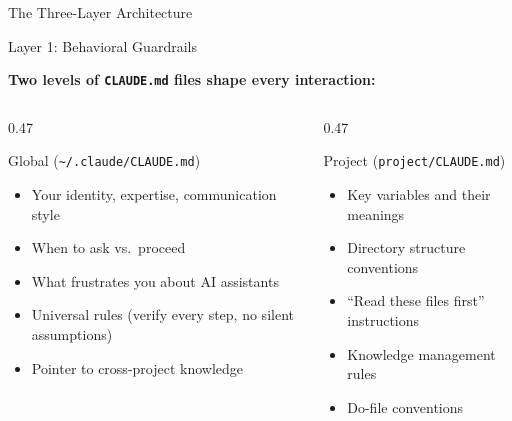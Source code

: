 \documentclass[aspectratio=169,11pt]{beamer}
\begin{document}
\begin{frame}{The Three-Layer Architecture}

\end{frame}

\begin{frame}[shrink=8]{Layer 1: Behavioral Guardrails}

\textbf{Two levels of \texttt{CLAUDE.md} files shape every interaction:}

\smallskip

\begin{columns}[T]
\begin{column}{0.47\textwidth}

\begin{block}{Global (\texttt{\textasciitilde/.claude/CLAUDE.md})}
\begin{itemize}\small
  \item Your identity, expertise, communication style
  \item When to ask vs.\ proceed
  \item What frustrates you about AI assistants
  \item Universal rules (verify every step, no silent assumptions)
  \item Pointer to cross-project knowledge
\end{itemize}
\end{block}

\end{column}
\begin{column}{0.47\textwidth}

\begin{block}{Project (\texttt{project/CLAUDE.md})}
\begin{itemize}\small
  \item Key variables and their meanings
  \item Directory structure conventions
  \item ``Read these files first'' instructions
  \item Knowledge management rules
  \item Do-file conventions
\end{itemize}
\end{block}


\end{column}
\end{columns}
\end{frame}
\end{document}

